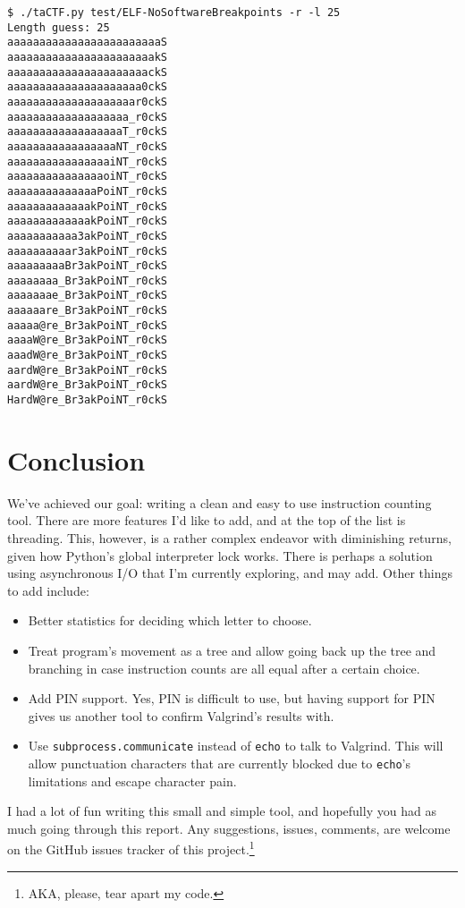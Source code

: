 \documentclass[11pt]{article}
\begin{document}
\begin{verbatim}
$ ./taCTF.py test/ELF-NoSoftwareBreakpoints -r -l 25
Length guess: 25
aaaaaaaaaaaaaaaaaaaaaaaaS
aaaaaaaaaaaaaaaaaaaaaaakS
aaaaaaaaaaaaaaaaaaaaaackS
aaaaaaaaaaaaaaaaaaaaa0ckS
aaaaaaaaaaaaaaaaaaaar0ckS
aaaaaaaaaaaaaaaaaaa_r0ckS
aaaaaaaaaaaaaaaaaaT_r0ckS
aaaaaaaaaaaaaaaaaNT_r0ckS
aaaaaaaaaaaaaaaaiNT_r0ckS
aaaaaaaaaaaaaaaoiNT_r0ckS
aaaaaaaaaaaaaaPoiNT_r0ckS
aaaaaaaaaaaaakPoiNT_r0ckS
aaaaaaaaaaaaakPoiNT_r0ckS
aaaaaaaaaaa3akPoiNT_r0ckS
aaaaaaaaaar3akPoiNT_r0ckS
aaaaaaaaaBr3akPoiNT_r0ckS
aaaaaaaa_Br3akPoiNT_r0ckS
aaaaaaae_Br3akPoiNT_r0ckS
aaaaaare_Br3akPoiNT_r0ckS
aaaaa@re_Br3akPoiNT_r0ckS
aaaaW@re_Br3akPoiNT_r0ckS
aaadW@re_Br3akPoiNT_r0ckS
aardW@re_Br3akPoiNT_r0ckS
aardW@re_Br3akPoiNT_r0ckS
HardW@re_Br3akPoiNT_r0ckS
\end{verbatim}



\section{Conclusion}
\label{sec:org77349ed}

We've achieved our goal: writing a clean and easy to use instruction
counting tool. There are more features I'd like to add, and at the top
of the list is threading. This, however, is a rather complex endeavor
with diminishing returns, given how Python's global interpreter lock
works. There is perhaps a solution using asynchronous I/O that I'm
currently exploring, and may add. Other things to add include:
\begin{itemize}
\item Better statistics for deciding which letter to choose.
\item Treat program's movement as a tree and allow going back up the tree
and branching in case instruction counts are all equal after a
certain choice.
\item Add PIN support. Yes, PIN is difficult to use, but having support
for PIN gives us another tool to confirm Valgrind's results with.
\item Use \texttt{subprocess.communicate} instead of \texttt{echo} to talk to Valgrind.
This will allow punctuation characters that are currently blocked
due to \texttt{echo}'s limitations and escape character pain.
\end{itemize}

I had a lot of fun writing this small and simple tool, and hopefully
you had as much going through this report. Any suggestions, issues,
comments, are welcome on the GitHub issues tracker of this project.\footnote{AKA, please, tear apart my code.}


\newpage
\printbibliography
\end{document}
